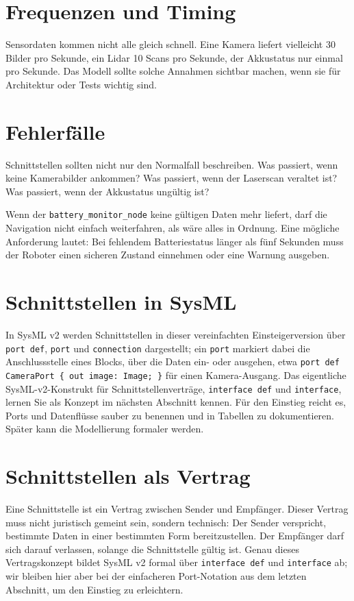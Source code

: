 \section{Frequenzen und Timing}
Sensordaten kommen nicht alle gleich schnell. Eine Kamera liefert vielleicht 30 Bilder pro Sekunde, ein Lidar 10 Scans pro Sekunde, der Akkustatus nur einmal pro Sekunde. Das Modell sollte solche Annahmen sichtbar machen, wenn sie für Architektur oder Tests wichtig sind.

\section{Fehlerfälle}
Schnittstellen sollten nicht nur den Normalfall beschreiben. Was passiert, wenn keine Kamerabilder ankommen? Was passiert, wenn der Laserscan veraltet ist? Was passiert, wenn der Akkustatus ungültig ist?

\begin{praxisbox}
Wenn der \texttt{battery\_monitor\_node} keine gültigen Daten mehr liefert, darf die Navigation nicht einfach weiterfahren, als wäre alles in Ordnung. Eine mögliche Anforderung lautet: Bei fehlendem Batteriestatus länger als fünf Sekunden muss der Roboter einen sicheren Zustand einnehmen oder eine Warnung ausgeben.
\end{praxisbox}

\section{Schnittstellen in SysML}
In SysML v2 werden Schnittstellen in dieser vereinfachten Einsteigerversion über \texttt{port def}, \texttt{port} und \texttt{connection} dargestellt; ein \texttt{port} markiert dabei die Anschlussstelle eines Blocks, über die Daten ein- oder ausgehen, etwa \texttt{port def CameraPort \{ out image: Image; \}} für einen Kamera-Ausgang. Das eigentliche SysML-v2-Konstrukt für Schnittstellenverträge, \texttt{interface def} und \texttt{interface}, lernen Sie als Konzept im nächsten Abschnitt kennen. Für den Einstieg reicht es, Ports und Datenflüsse sauber zu benennen und in Tabellen zu dokumentieren. Später kann die Modellierung formaler werden.

\section{Schnittstellen als Vertrag}
Eine Schnittstelle ist ein Vertrag zwischen Sender und Empfänger. Dieser Vertrag muss nicht juristisch gemeint sein, sondern technisch: Der Sender verspricht, bestimmte Daten in einer bestimmten Form bereitzustellen. Der Empfänger darf sich darauf verlassen, solange die Schnittstelle gültig ist. Genau dieses Vertragskonzept bildet SysML v2 formal über \texttt{interface def} und \texttt{interface} ab; wir bleiben hier aber bei der einfacheren Port-Notation aus dem letzten Abschnitt, um den Einstieg zu erleichtern.

